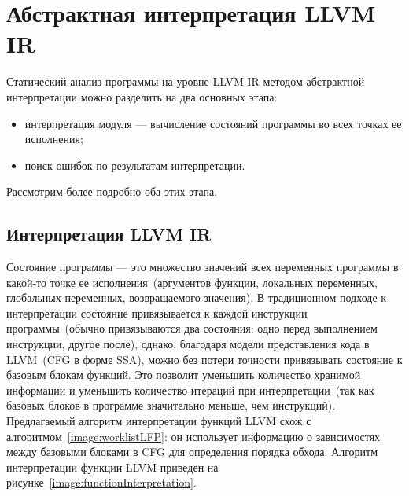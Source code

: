 \section{Абстрактная интерпретация LLVM IR}
Статический анализ программы на уровне LLVM IR методом абстрактной 
интерпретации можно разделить на два основных этапа:
\begin{itemize}
\item интерпретация модуля --- вычисление состояний программы во всех точках
ее исполнения;
\item поиск ошибок по результатам интерпретации.
\end{itemize}

Рассмотрим более подробно оба этих этапа.

\subsection{Интерпретация LLVM IR}
Состояние программы --- это множество значений всех переменных программы в 
какой-то точке ее исполнения~(аргументов функции, локальных переменных, 
глобальных переменных, возвращаемого значения). В традиционном подходе к 
интерпретации состояние привязывается к каждой инструкции программы~(обычно 
привязываются два состояния: одно перед выполнением инструкции, другое после), 
однако, благодаря модели представления кода в LLVM~(CFG в форме SSA), можно 
без потери точности привязывать состояние к базовым блокам функций. Это 
позволит уменьшить количество хранимой информации и уменьшить количество 
итераций при интерпретации~(так как базовых блоков в программе значительно 
меньше, чем инструкций). Предлагаемый алгоритм интерпретации функций LLVM схож 
с алгоритмом~\ref{image:worklistLFP}: он использует информацию о зависимостях
между базовыми блоками в CFG для определения порядка обхода. Алгоритм 
интерпретации функции LLVM приведен на 
рисунке~\ref{image:functionInterpretation}.

